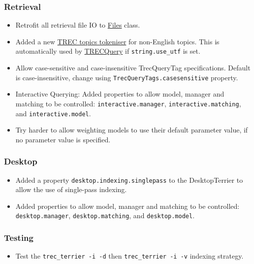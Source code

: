 \subsubsection{Retrieval}\label{retrieval-6}

\begin{itemize}
\tightlist
\item
  Retrofit all retrieval file IO to
  \href{javadoc/org/terrier/utility/Files.html}{Files} class.
\item
  Added a new
  \href{javadoc/org/terrier/indexing/TRECFullUTFTokenizer.html}{TREC
  topics tokeniser} for non-English topics. This is automatically used
  by \href{javadoc/org/terrier/structures/TRECQuery.html}{TRECQuery} if
  \texttt{string.use\_utf} is set.
\item
  Allow case-sensitive and case-insensitive TrecQueryTag specifications.
  Default is case-insensitive, change using
  \texttt{TrecQueryTags.casesensitive} property.
\item
  Interactive Querying: Added properties to allow model, manager and
  matching to be controlled: \texttt{interactive.manager},
  \texttt{interactive.matching}, and \texttt{interactive.model}.
\item
  Try harder to allow weighting models to use their default parameter
  value, if no parameter value is specified.
\end{itemize}

\subsubsection{Desktop}\label{desktop-2}

\begin{itemize}
\tightlist
\item
  Added a property \texttt{desktop.indexing.singlepass} to the
  DesktopTerrier to allow the use of single-pass indexing.
\item
  Added properties to allow model, manager and matching to be
  controlled: \texttt{desktop.manager}, \texttt{desktop.matching}, and
  \texttt{desktop.model}.
\end{itemize}

\subsubsection{Testing}\label{testing-3}

\begin{itemize}
\tightlist
\item
  Test the \texttt{trec\_terrier\ -i\ -d} then
  \texttt{trec\_terrier\ -i\ -v} indexing strategy.
\end{itemize}

